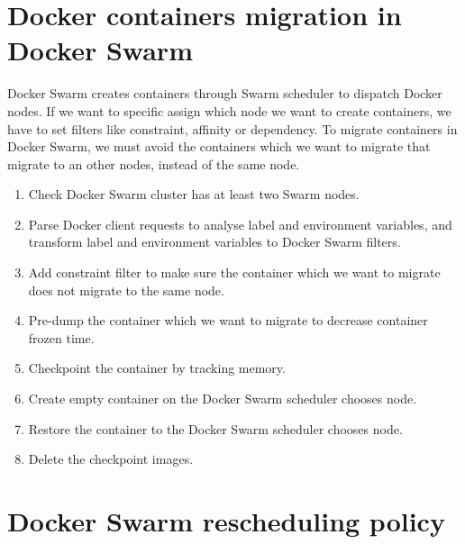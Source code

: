 \section{Docker containers migration in Docker Swarm}
Docker Swarm creates containers through Swarm scheduler to dispatch Docker nodes. If we want to specific assign which node we want to create containers, we have to set filters like constraint, affinity or dependency. To migrate containers in Docker Swarm, we must avoid the containers which we want to migrate that migrate to an other nodes, instead of the same node.
\begin{enumerate}[Step 1]
	\item Check Docker Swarm cluster has at least two Swarm nodes.
    \item Parse Docker client requests to analyse label and environment variables, and transform label and environment variables to Docker Swarm filters.
    \item Add constraint filter to make sure the container which we want to migrate does not migrate to the same node.
    \item Pre-dump the container which we want to migrate to decrease container frozen time.
    \item Checkpoint the container by tracking memory.
    \item Create empty container on the Docker Swarm scheduler chooses node.
    \item Restore the container to the Docker Swarm scheduler chooses node.
    \item Delete the checkpoint images.
\end{enumerate}

\section{Docker Swarm rescheduling policy}

